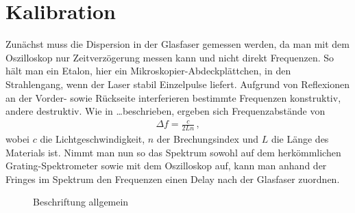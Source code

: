 \documentclass[bachelor,       %
               twoside,        %
               BCOR10mm,       %
               english,ngerman, %
               ]{GAUBM}
\begin{document}
\section{Kalibration}
Zunächst muss die Dispersion in der Glasfaser gemessen werden, da man mit dem Oszilloskop nur Zeitverzögerung messen kann und nicht direkt Frequenzen.
So hält man ein Etalon, hier ein Mikroskopier-Abdeckplättchen, in den Strahlengang, wenn der Laser stabil Einzelpulse liefert.
Aufgrund von Reflexionen an der Vorder- sowie Rückseite interferieren bestimmte Frequenzen konstruktiv, andere destruktiv.
Wie in \dots beschrieben, ergeben sich Frequenzabstände von
\begin{align*}
	\Delta f=\frac{c}{2Ln}\,,
\end{align*}
wobei $c$ die Lichtgeschwindigkeit, $n$ der Brechungsindex und $L$ die Länge des Materials ist.
Nimmt man nun so das Spektrum sowohl auf dem herkömmlichen Grating-Spektrometer sowie mit dem Oszilloskop auf, kann man anhand der Fringes im Spektrum den Frequenzen einen Delay nach der Glasfaser zuordnen.

 \begin{figure}[!htb]
   \centering
   \hfill
   \hfill
   \caption{Beschriftung allgemein}
   \label{fig:label-gesamt}
 \end{figure}
\end{document}
